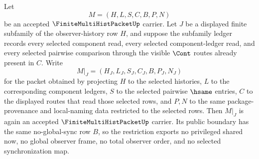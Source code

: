 \begin{theorem}
\label{thm:finite-multihist-packet-subpacket-restriction}
Let
$$
M=(H,L,S,C,B,P,N)
$$
be an accepted $\FiniteMultiHistPacketUp$ carrier. Let $J$ be a displayed finite subfamily of the observer-history row $H$, and suppose the subfamily ledger records every selected component read, every selected component-ledger read, and every selected pairwise comparison through the visible $\Cont$ routes already present in $C$. Write
$$
M|_J=(H_J,L_J,S_J,C_J,B,P_J,N_J)
$$
for the packet obtained by projecting $H$ to the selected histories, $L$ to the corresponding component ledgers, $S$ to the selected pairwise $\hsame$ entries, $C$ to the displayed routes that read those selected rows, and $P,N$ to the same package-provenance and local-naming data restricted to the selected rows. Then $M|_J$ is again an accepted $\FiniteMultiHistPacketUp$ carrier. Its public boundary has the same no-global-sync row $B$, so the restriction exports no privileged shared now, no global observer frame, no total observer order, and no selected synchronization map.
\end{theorem}
